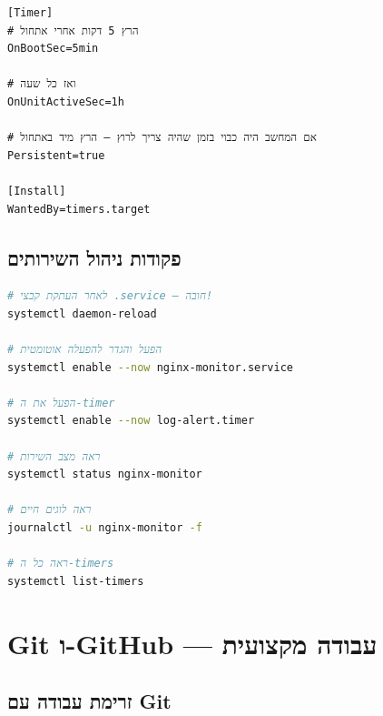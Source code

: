 \documentclass[12pt,a4paper]{article}
\begin{document}
\begin{lstlisting}[caption={log-alert.timer}]
[Timer]
# הרץ 5 דקות אחרי אתחול
OnBootSec=5min

# ואז כל שעה
OnUnitActiveSec=1h

# אם המחשב היה כבוי בזמן שהיה צריך לרוץ — הרץ מיד באתחול
Persistent=true

[Install]
WantedBy=timers.target
\end{lstlisting}

\subsection{פקודות ניהול השירותים}

\begin{lstlisting}[language=bash]
# לאחר העתקת קבצי .service — חובה!
systemctl daemon-reload

# הפעל והגדר להפעלה אוטומטית
systemctl enable --now nginx-monitor.service

# הפעל את ה-timer
systemctl enable --now log-alert.timer

# ראה מצב השירות
systemctl status nginx-monitor

# ראה לוגים חיים
journalctl -u nginx-monitor -f

# ראה כל ה-timers
systemctl list-timers
\end{lstlisting}

\newpage
\section{Git ו-GitHub — עבודה מקצועית}

\subsection{זרימת עבודה עם Git}

\begin{center}
\end{center}
\end{document}
